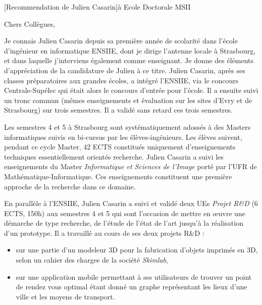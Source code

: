 \documentclass[a4paper,10pt]{article}
\begin{document}

\begin{letter}[Recommendation de Julien Casarin]{à}%
{Ecole Doctorale MSII}

\vspace{-1cm}
Chers Collègues,

Je connais  Julien Casarin depuis  sa première  année de scolarité  dans l'école
d'ingénieur  en  informatique   ENSIIE,  dont  je  dirige   l'antenne  locale  à
Strasbourg, et dans  laquelle j'interviens également comme  enseignant. Je donne
des  éléments d'appréciation  de la  candidature de  Julien à  ce titre.  Julien
Casarin, après ses classes préparatoires aux grandes écoles, a intégré l'ENSIIE,
via  le concours  Centrale-Supélec qui  était  alors le  concours d'entrée  pour
l'école. Il a  ensuite suivi un tronc commun (mêmes  enseignements et évaluation
sur les sites  d'Evry et de Strasbourg)  sur trois semestres.  Il  a validé sans
retard ces trois semestres.

Les semestres  4 et 5 à  Strasbourg sont systématiquement adossés  à des Masters
informatiques suivis en bi-cursus par  les élèves-ingénieurs. Les élèves suivent,
pendant ce cycle Master, 42 ECTS constitués uniquement d'enseignements techniques
essentiellement orientés recherche. Julien Casarin a suivi les enseignements du Master
\textit{Informatique   et   Sciences   de    l'Image}   porté   par   l'UFR   de
Mathématique-Informatique. Ces enseignements constituent une première approche
de la recherche dans ce domaine.

En  parallèle   à  l'ENSIIE,  Julien  Casarin   a  suivi  et  validé   deux  UEs
\textit{Projet R\&D} (6 ECTS,  150h) aux semestres 4 et 5  qui sont l'occasion de
mettre en  {\oe}uvre une  démarche de  type recherche, de  l'étude de  l'état de
l'art jusqu'à la réalisation d'un prototype. Il a travaillé au cours de ses deux
projets R\&D  : 
\begin{itemize}
\item sur  une partie d'un modeleur  3D pour la  fabrication d'objets
imprimés en  3D, selon un cahier  des charges de la  société \textit{Skimlab}, 
\item sur  une application mobile  permettant à  ses utilisateurs de  trouver un
  point de  rendez vous  optimal étant  donné un  graphe représentant  les lieux
  d'une ville et les moyens de transport.
\end{itemize}




\end{letter}
\end{document}
